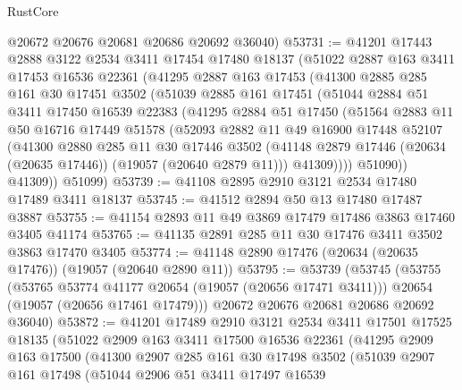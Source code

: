 \begin{lexlean}{RustCore}
\begin{coremodule}
      @20672
      @20676
      @20681
      @20686
      @20692
      @36040)
@53731 := @41201
    @17443
    @2888
    @3122
    @2534
    @3411
    @17454
    @17480
    @18137
    (@51022
      @2887
      @163
      @3411
      @17453
      @16536
      @22361
      (@41295
        @2887
        @163
        @17453
        (@41300
          @2885
          @285
          @161
          @30
          @17451
          @3502
          (@51039
            @2885
            @161
            @17451
            (@51044
              @2884
              @51
              @3411
              @17450
              @16539
              @22383
              (@41295
                @2884
                @51
                @17450
                (@51564
                  @2883
                  @11
                  @50
                  @16716
                  @17449
                  @51578
                  (@52093
                    @2882
                    @11
                    @49
                    @16900
                    @17448
                    @52107
                    (@41300
                      @2880
                      @285
                      @11
                      @30
                      @17446
                      @3502
                      (@41148 @2879 @17446 (@20634 (@20635 @17446)) (@19057 (@20640 @2879 @11)))
                      @41309))))
              @51090))
          @41309))
      @51099)
@53739 := @41108 @2895 @2910 @3121 @2534 @17480 @17489 @3411 @18137
@53745 := @41512 @2894 @50 @13 @17480 @17487 @3887
@53755 := @41154 @2893 @11 @49 @3869 @17479 @17486 @3863 @17460 @3405 @41174
@53765 := @41135 @2891 @285 @11 @30 @17476 @3411 @3502 @3863 @17470 @3405
@53774 := @41148 @2890 @17476 (@20634 (@20635 @17476)) (@19057 (@20640 @2890 @11))
@53795 := @53739
    (@53745
      (@53755
        (@53765 @53774 @41177 @20654 (@19057 (@20656 @17471 @3411)))
        @20654
        (@19057 (@20656 @17461 @17479)))
      @20672
      @20676
      @20681
      @20686
      @20692
      @36040)
@53872 := @41201
    @17489
    @2910
    @3121
    @2534
    @3411
    @17501
    @17525
    @18135
    (@51022
      @2909
      @163
      @3411
      @17500
      @16536
      @22361
      (@41295
        @2909
        @163
        @17500
        (@41300
          @2907
          @285
          @161
          @30
          @17498
          @3502
          (@51039
            @2907
            @161
            @17498
            (@51044
              @2906
              @51
              @3411
              @17497
              @16539

\end{coremodule}
\end{lexlean}
